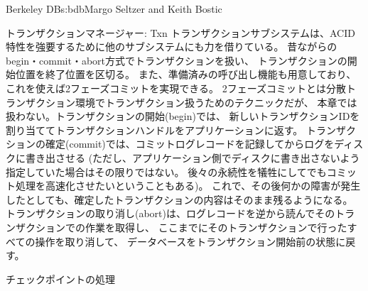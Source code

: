 \begin{aosachapter}{Berkeley DB}{s:bdb}{Margo Seltzer and Keith Bostic}
\begin{aosasect1}{トランザクションマネージャー: Txn}
トランザクションサブシステムは、ACID特性を強要するために他のサブシステムにも力を借りている。
昔ながらのbegin・commit・abort方式でトランザクションを扱い、
トランザクションの開始位置を終了位置を区切る。
また、準備済みの呼び出し機能も用意しており、これを使えば2フェーズコミットを実現できる。
2フェーズコミットとは分散トランザクション環境でトランザクション扱うためのテクニックだが、
本章では扱わない。トランザクションの開始(begin)では、
新しいトランザクションIDを割り当ててトランザクションハンドルをアプリケーションに返す。
トランザクションの確定(commit)では、コミットログレコードを記録してからログをディスクに書き出させる
(ただし、アプリケーション側でディスクに書き出さないよう指定していた場合はその限りではない。
後々の永続性を犠牲にしてでもコミット処理を高速化させたいということもある)。
これで、その後何かの障害が発生したとしても、確定したトランザクションの内容はそのまま残るようになる。
トランザクションの取り消し(abort)は、ログレコードを逆から読んでそのトランザクションでの作業を取得し、
ここまでにそのトランザクションで行ったすべての操作を取り消して、
データベースをトランザクション開始前の状態に戻す。

\begin{aosasect2}{チェックポイントの処理}



\end{aosasect2}
\end{aosasect1}
\end{aosachapter}
